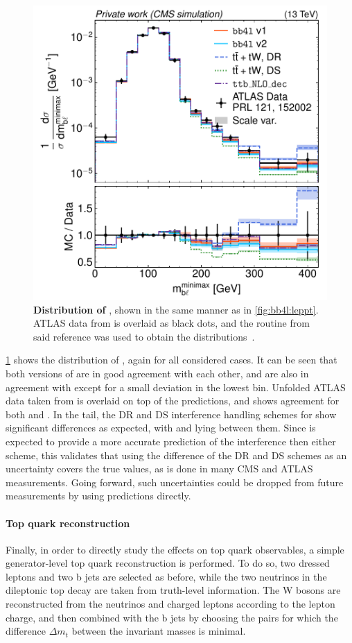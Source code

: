 \begin{figure}[tp]
    \centering
    \includegraphics[width=0.49 \textwidth]{figures/bb4l/generators/ATLAS_2018_I1677498_d03-x01-y01.pdf}
    \caption{\textbf{Distribution of \mblminimax}, shown in the same manner as in \cref{fig:bb4l:leppt}. ATLAS data from  is overlaid as black dots, and the \rivet routine from said reference was used to obtain the distributions~\cite{CMS:NOTE-2023-015}.}
    \label{fig:bb4l:mbl}
\end{figure}

\cref{fig:bb4l:mbl} shows the distribution of \mblminimax, again for all considered cases. It can be seen that both versions of \bbfourl are in good agreement with each other, and are also in agreement with \ttb except for a small deviation in the lowest bin. Unfolded ATLAS data taken from  is overlaid on top of the predictions, and shows agreement for both \bbfourl and \ttb. 
In the tail, the DR and DS interference handling schemes for \tttWsum show significant differences as expected, with \bbfourl and \ttb lying between them. Since \bbfourl is expected to provide a more accurate prediction of the interference then either scheme, this validates that using the difference of the DR and DS schemes as an uncertainty covers the true values, as is done in many CMS and ATLAS measurements. Going forward, such uncertainties could be dropped from future measurements by using \bbfourl predictions directly.

\paragraph{Top quark reconstruction} Finally, in order to directly study the effects on top quark observables, a simple generator-level top quark reconstruction is performed. To do so, two dressed leptons and two b jets are selected as before, while the two neutrinos in the dileptonic top decay are taken from truth-level information. The W bosons are reconstructed from the neutrinos and charged leptons according to the lepton charge, and then combined with the b jets by choosing the pairs for which the difference $\Delta m_t$ between the invariant masses is minimal. 

